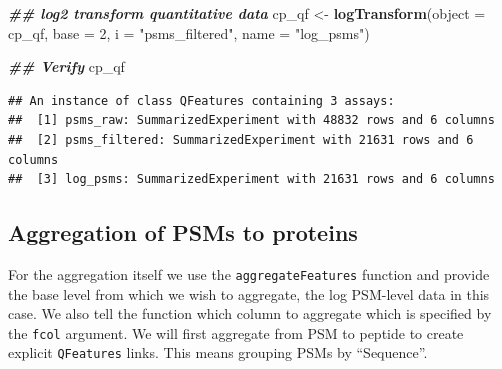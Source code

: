 \documentclass[9pt,a4paper,]{extarticle}
\newenvironment{Shaded}{\begin{snugshade}}{\end{snugshade}}
\newcommand{\AttributeTok}[1]{\textcolor[rgb]{0.13,0.29,0.53}{#1}}
\newcommand{\DecValTok}[1]{\textcolor[rgb]{0.00,0.00,0.81}{#1}}
\newcommand{\DocumentationTok}[1]{\textcolor[rgb]{0.56,0.35,0.01}{\textbf{\textit{#1}}}}
\newcommand{\FunctionTok}[1]{\textcolor[rgb]{0.13,0.29,0.53}{\textbf{#1}}}
\newcommand{\NormalTok}[1]{#1}
\newcommand{\OtherTok}[1]{\textcolor[rgb]{0.56,0.35,0.01}{#1}}
\newcommand{\StringTok}[1]{\textcolor[rgb]{0.31,0.60,0.02}{#1}}
\begin{document}
\begin{Shaded}
\begin{Highlighting}[]
\DocumentationTok{\#\# log2 transform quantitative data}
\NormalTok{cp\_qf }\OtherTok{\textless{}{-}} \FunctionTok{logTransform}\NormalTok{(}\AttributeTok{object =}\NormalTok{ cp\_qf,}
                      \AttributeTok{base =} \DecValTok{2}\NormalTok{,}
                      \AttributeTok{i =} \StringTok{"psms\_filtered"}\NormalTok{,}
                      \AttributeTok{name =} \StringTok{"log\_psms"}\NormalTok{)}

\DocumentationTok{\#\# Verify}
\NormalTok{cp\_qf}
\end{Highlighting}
\end{Shaded}

\begin{verbatim}
## An instance of class QFeatures containing 3 assays:
##  [1] psms_raw: SummarizedExperiment with 48832 rows and 6 columns 
##  [2] psms_filtered: SummarizedExperiment with 21631 rows and 6 columns 
##  [3] log_psms: SummarizedExperiment with 21631 rows and 6 columns
\end{verbatim}

\subsection{Aggregation of PSMs to proteins}\label{aggregation-of-psms-to-proteins}

For the aggregation itself we use the \texttt{aggregateFeatures} function and provide
the base level from which we wish to aggregate, the log PSM-level data in this
case. We also tell the function which column to aggregate which is specified by
the \texttt{fcol} argument. We will first aggregate from PSM to peptide to create
explicit \texttt{QFeatures} links. This means grouping PSMs by ``Sequence''.
\end{document}
